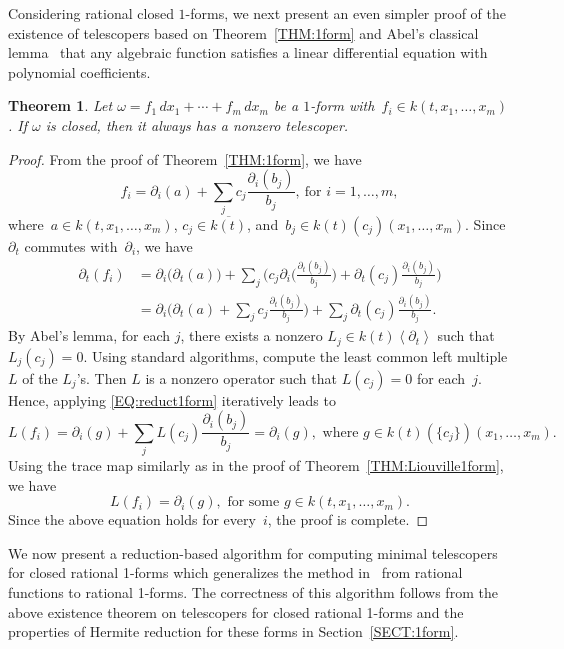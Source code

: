 \documentclass{amsart}
\newtheorem{thm}{Theorem}
\theoremstyle{definition}
\numberwithin{equation}{section}
\numberwithin{thm}{section}
\begin{document}
Considering rational closed $1$-forms, we next present an even simpler proof of the existence of telescopers based on Theorem~\ref{THM:1form} and Abel's classical lemma~\cite{Abel1827,BCSLS07} that any algebraic function satisfies a linear differential equation with polynomial coefficients.
\begin{thm}\label{THM:CTrational}
    Let $\omega= f_1 \, dx_1+ \cdots + f_m \, dx_m$ be a $1$-form with~$f_i \in k(t,x_1,\ldots,x_m)$. If $\omega$ is closed, then it always has a nonzero telescoper.
\end{thm}
\begin{proof}
    From the proof of Theorem~\ref{THM:1form}, we have
    \[
        f_i = \partial_i(a) + \sum_{j} c_j \frac{\partial_i(b_j)}{b_j}, \ \text{for } i=1,\ldots,m,
    \]
    where~$a\in k(t,x_1,\ldots,x_m)$, $c_j\in \overline{k(t)}$, and~$b_j \in k(t)(c_j)(x_1,\ldots,x_m)$. Since $\partial_t$ commutes with~$\partial_i$, we have 
\begin{equation}
    \begin{aligned} \label{EQ:reduct1form}
        \partial_t(f_i) &= \partial_i\bigl(\partial_t(a)\bigr) + \sum_j \Biggl(\! c_j \partial_i \biggl(\frac{\partial_t(b_j)}{b_j} \biggr)+ 
        \partial_t(c_j)\frac{\partial_i(b_j)}{b_j}\Biggr)\\
        &= \partial_i \biggl(\!\partial_t(a) + \sum_j c_j \frac{\partial_t(b_j)}{b_j} \biggr) + \sum_j \partial_t(c_j)\frac{\partial_i(b_j)}{b_j}.
    \end{aligned}
    \end{equation}
    By Abel's lemma, for each $j$, there exists a nonzero $L_j \in k(t)\left\langle \partial_t \right\rangle$ such that $L_j(c_j)=0$.
    Using standard algorithms, compute the least common left multiple $L$ of the $L_j$'s.  Then $L$ is a nonzero operator  such that $L(c_j)=0$ for each~$j$.
    Hence, applying \eqref{EQ:reduct1form} iteratively leads to 
    \[
        L(f_i) = \partial_i(g) + \sum_j L(c_j) \frac{\partial_i(b_j)}{b_j}= \partial_i(g), \text{ where }g\in k(t)(\{c_j\})(x_1,\ldots,x_m).
    \]
    Using the trace map similarly as in the proof of Theorem~\ref{THM:Liouville1form}, we have 
    \[
        L(f_i) = \partial_i(g) , \text{ for some }g \in k(t,x_1,\ldots,x_m). 
    \]
    Since the above equation holds for every~$i$, the proof is complete.
\end{proof}


We now present a reduction-based algorithm for computing minimal telescopers for 
 closed rational 1-forms which generalizes the method in~\cite{BostanChenChyzakLi}
 from rational functions to rational 1-forms. The correctness of this algorithm follows from the above existence theorem on telescopers for closed rational 1-forms
 and the properties of Hermite reduction for these forms in Section~\ref{SECT:1form}.
 
\end{document}
